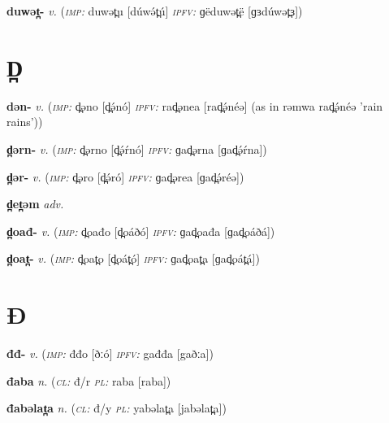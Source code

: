 \newentry
\headword\textbf{duwət̪-}  
\ipa{[dúwət̪-]}
\synpos\textit{v.} 
\imperative(\textit {\textsc{imp:}} duwət̪u [dúwə́t̪ú]
\imperfective\textit {\textsc{ipfv:}} ɡëduwət̪ë [ɡɜdúwət̪ɜ])


\section*{D̪}\label{D̪}

\newentry
\headword\textbf{dən-}
\ipa{[d̪ə́n-]}
\synpos\textit{v.} 
\imperative(\textit {\textsc{imp:}} d̪əno [d̪ə́nó] 
\imperfective\textit{\textsc{ipfv:}} rad̪ənea [rad̪ə́néə] (as in rəmwa rad̪ə́néə 'rain rains'))

\newentry
\headword\textbf{d̪ərn-}
\ipa{[d̪ə́ŕn-]}
\synpos\textit{v.} 
\imperative(\textit {\textsc{imp:}} d̪ərno [d̪ə́ŕnó] 
\imperfective\textit{\textsc{ipfv:}} ɡad̪ərna [ɡad̪ə́ŕna])

\newentry
\headword\textbf{d̪ər-}
\ipa{[d̪ə́r-]}
\synpos\textit{v.} 
\imperative(\textit {\textsc{imp:}} d̪əro [d̪ə́ró] 
\imperfective\textit{\textsc{ipfv:}} ɡad̪ərea [ɡad̪ə́réə])

\newentry
\headword\textbf{d̪et̪əm} 
\ipa{[d̪et̪əm]} 
\synpos\textit{adv.} 

\newentry
\headword\textbf{d̪oađ-}
\ipa{[d̪oáð-]}
\synpos\textit{v.} 
\imperative(\textit {\textsc{imp:}} d̪oađo [d̪oáðó] 
\imperfective\textit{\textsc{ipfv:}} ɡad̪oađa [ɡad̪oáðá])

\newentry
\headword\textbf{d̪oat̪-}
\ipa{[d̪oát̪-]}
\synpos\textit{v.} 
\imperative(\textit {\textsc{imp:}} d̪oat̪o [d̪oát̪ó] 
\imperfective\textit{\textsc{ipfv:}} ɡad̪oat̪a [ɡad̪oát̪á])


\section*{Đ}\label{Đ}

\newentry
\headword\textbf{đđ-}  
\ipa{[ðː-]}
\synpos\textit{v.} 
\imperative(\textit {\textsc{imp:}} đđo [ðːó]
\imperfective\textit {\textsc{ipfv:}} gađđa [gaðːa])


\newentry
\headword\textbf{đaba}  
\ipa{[ðaba]}
\synpos\textit{n.} 
\class(\textit{\textsc{cl:}} {đ/r}
\plural\textit{\textsc{pl:}} raba [raba])

\newentry
\headword\textbf{đabəlat̪a}  
\ipa{[ðabəlat̪a]}
\synpos\textit{n.} 
\class(\textit{\textsc{cl:}} {đ/y}
\plural\textit{\textsc{pl:}} yabəlat̪a [jabəlat̪a])

